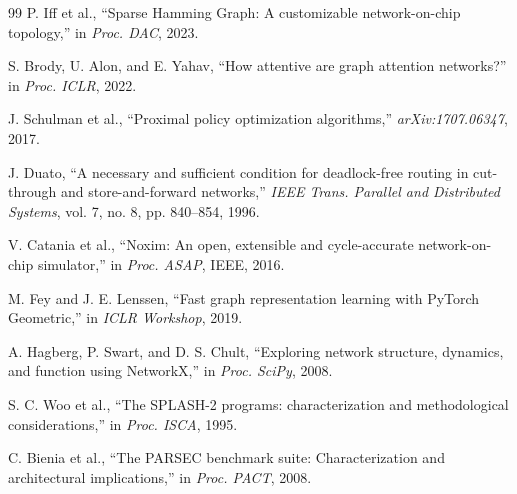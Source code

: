 \documentclass[conference]{IEEEtran}
\begin{document}
\begin{thebibliography}{99}
P. Iff et al., ``Sparse Hamming Graph: A customizable network-on-chip topology,'' in \textit{Proc. DAC}, 2023.

S. Brody, U. Alon, and E. Yahav, ``How attentive are graph attention networks?'' in \textit{Proc. ICLR}, 2022.

J. Schulman et al., ``Proximal policy optimization algorithms,'' \textit{arXiv:1707.06347}, 2017.

J. Duato, ``A necessary and sufficient condition for deadlock-free routing in cut-through and store-and-forward networks,'' \textit{IEEE Trans. Parallel and Distributed Systems}, vol. 7, no. 8, pp. 840--854, 1996.

V. Catania et al., ``Noxim: An open, extensible and cycle-accurate network-on-chip simulator,'' in \textit{Proc. ASAP}, IEEE, 2016.

M. Fey and J. E. Lenssen, ``Fast graph representation learning with PyTorch Geometric,'' in \textit{ICLR Workshop}, 2019.

A. Hagberg, P. Swart, and D. S. Chult, ``Exploring network structure, dynamics, and function using NetworkX,'' in \textit{Proc. SciPy}, 2008.

S. C. Woo et al., ``The SPLASH-2 programs: characterization and methodological considerations,'' in \textit{Proc. ISCA}, 1995.

C. Bienia et al., ``The PARSEC benchmark suite: Characterization and architectural implications,'' in \textit{Proc. PACT}, 2008.

\end{thebibliography}
\end{document}
